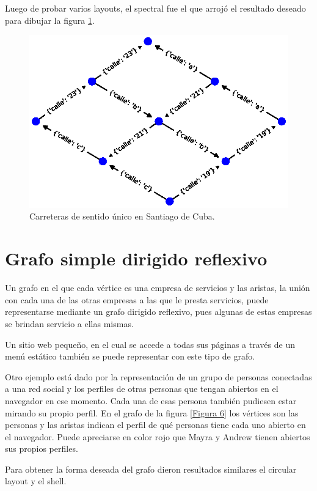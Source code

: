 \documentclass{article}
\begin{document}
Luego de probar varios layouts, el spectral fue el que arrojó el resultado deseado para dibujar la figura \ref{Figura 5}.

\begin{figure}
  \includegraphics[width=.8\columnwidth]{fig5.eps}
  \caption{Carreteras de sentido único en Santiago de Cuba.}
  \label{Figura 5}
\end{figure}




\section{Grafo simple dirigido reflexivo}

Un grafo en el que cada vértice es una empresa de servicios y las aristas, la unión con cada una de las otras empresas a las que le presta servicios, puede representarse mediante un grafo dirigido reflexivo, pues algunas de estas empresas se brindan servicio a ellas mismas. 

Un sitio web pequeño, en el cual se accede a todas sus páginas a través de un menú estático también se puede representar con este tipo de grafo. 

Otro ejemplo está dado por la representación de un grupo de personas conectadas a una red social y los perfiles de otras personas que tengan abiertos en el navegador en ese momento. Cada una de esas persona también pudiesen estar mirando su propio
perfil. En el grafo de la figura \ref{Figura 6} los vértices son las personas y las aristas indican el perfil de qué personas tiene cada uno abierto en el navegador. Puede apreciarse en color rojo que Mayra y Andrew tienen abiertos sus propios perfiles.

Para obtener la forma deseada del grafo dieron resultados similares el circular layout y el shell.
\end{document}
